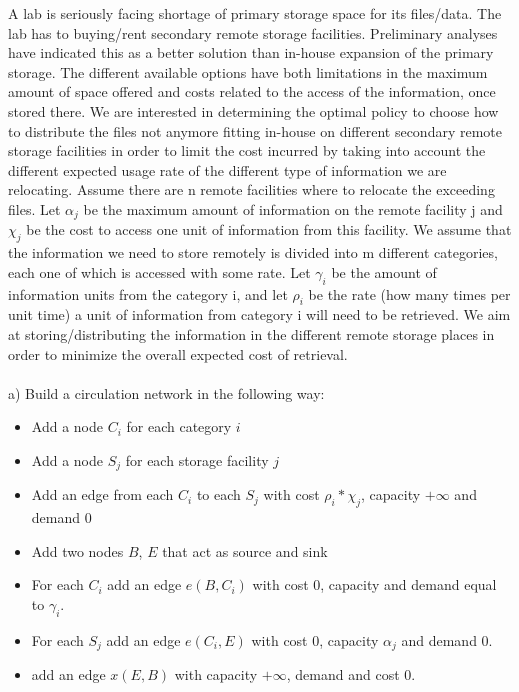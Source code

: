 \documentclass[]{article}
\begin{document}
A lab is seriously facing shortage of primary storage space for its files/data. The lab has to buying/rent
secondary remote storage facilities. Preliminary analyses have indicated this as a better solution than
in-house expansion of the primary storage. The different available options have both limitations in the
maximum amount of space offered and costs related to the access of the information, once stored there.
We are interested in determining the optimal policy to choose how to distribute the files not anymore
fitting in-house on different secondary remote storage facilities in order to limit the cost incurred by taking
into account the different expected usage rate of the different type of information we are relocating.
Assume there are n remote facilities where to relocate the exceeding files. Let $\alpha_j$ be the maximum
amount of information on the remote facility j and $\chi_j$ be the cost to access one unit of information
from this facility. We assume that the information we need to store remotely is divided into m different
categories, each one of which is accessed with some rate. Let $\gamma_i$ be the amount of information units from
the category i, and let $\rho_i$ be the rate (how many times per unit time) a unit of information from category
i will need to be retrieved. We aim at storing/distributing the information in the different remote storage
places in order to minimize the overall expected cost of retrieval.
\\\\
a) Build a circulation network in the following way:
\begin{itemize}
  \item Add a node $C_i$ for each category $i$
  \item Add a node $S_j$ for each storage facility $j$
  \item Add an edge from each $C_i$ to each $S_j$ with cost $\rho_i * \chi_j$, capacity $+\infty$ and demand $0$
  \item Add two nodes $B$, $E$ that act as source and sink
  \item For each $C_i$ add an edge $e(B, C_i)$ with cost $0$, capacity and demand equal to $\gamma_i$.
  \item For each $S_j$ add an edge $e(C_i, E)$ with cost $0$, capacity $\alpha_j$ and demand $0$.
  \item add an edge $x(E, B)$ with capacity $+\infty$, demand and cost $0$.
\end{itemize}
\end{document}
